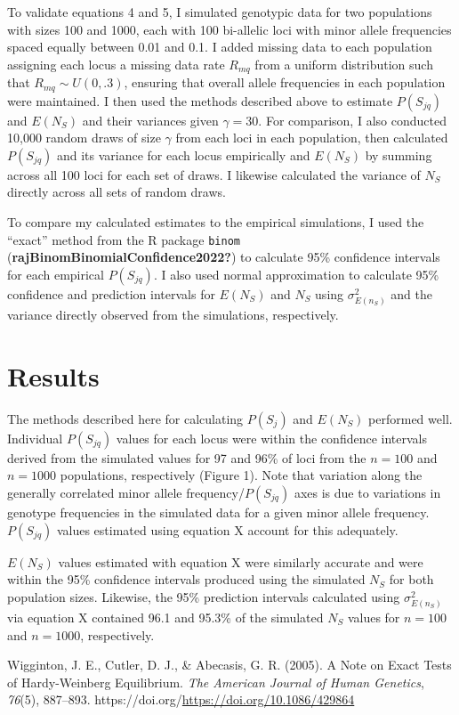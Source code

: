 \documentclass[
  12pt,
]{article}
\newlength{\cslhangindent}
\newlength{\cslentryspacingunit} %
\newenvironment{CSLReferences}[2] %
 {%
  \setlength{\parindent}{0pt}
  \ifodd #1
  \let\oldpar\par
  \def\par{\hangindent=\cslhangindent\oldpar}
  \fi
  \setlength{\parskip}{#2\cslentryspacingunit}
 }%
 {}
\begin{document}
To validate equations 4 and 5, I simulated genotypic data for two
populations with sizes 100 and 1000, each with 100 bi-allelic loci with
minor allele frequencies spaced equally between 0.01 and 0.1. I added
missing data to each population assigning each locus a missing data rate
\(R_{mq}\) from a uniform distribution such that
\(R_{mq} \sim U(0,.3)\), ensuring that overall allele frequencies in
each population were maintained. I then used the methods described above
to estimate \(P({S_{jq}})\) and \(E(N_{S})\) and their variances given
\(\gamma = 30\). For comparison, I also conducted 10,000 random draws of
size \(\gamma\) from each loci in each population, then calculated
\(P({S_{jq}})\) and its variance for each locus empirically and
\(E(N_{S})\) by summing across all 100 loci for each set of draws. I
likewise calculated the variance of \(N_{S}\) directly across all sets
of random draws.

To compare my calculated estimates to the empirical simulations, I used
the ``exact'' method from the R package \texttt{binom}
(\textbf{rajBinomBinomialConfidence2022?}) to calculate 95\% confidence
intervals for each empirical \(P({S_{jq}})\). I also used normal
approximation to calculate 95\% confidence and prediction intervals for
\(E(N_{S})\) and \(N_{S}\) using \(\sigma_{E(n_{S})}^{2}\) and the
variance directly observed from the simulations, respectively.

\hypertarget{results}{%
\section{Results}\label{results}}

The methods described here for calculating \(P({S_{j}})\) and
\(E(N_{S})\) performed well. Individual \(P({S_{jq}})\) values for each
locus were within the confidence intervals derived from the simulated
values for 97 and 96\% of loci from the \(n = 100\) and \(n = 1000\)
populations, respectively (Figure 1). Note that variation along the
generally correlated minor allele frequency/\(P({S_{jq}})\) axes is due
to variations in genotype frequencies in the simulated data for a given
minor allele frequency. \(P({S_{jq}})\) values estimated using equation
X account for this adequately.

\(E(N_{S})\) values estimated with equation X were similarly accurate
and were within the 95\% confidence intervals produced using the
simulated \(N_{S}\) for both population sizes. Likewise, the 95\%
prediction intervals calculated using \(\sigma_{E(n_{S})}^{2}\) via
equation X contained 96.1 and 95.3\% of the simulated \(N_{S}\) values
for \(n = 100\) and \(n = 1000\), respectively.

\hypertarget{refs}{}
\begin{CSLReferences}{1}{0}
\leavevmode{}%
Wigginton, J. E., Cutler, D. J., \& Abecasis, G. R. (2005). A {Note} on
{Exact} {Tests} of {Hardy}-{Weinberg} {Equilibrium}. \emph{The American
Journal of Human Genetics}, \emph{76}(5), 887--893.
https://doi.org/\url{https://doi.org/10.1086/429864}

\end{CSLReferences}
\end{document}
